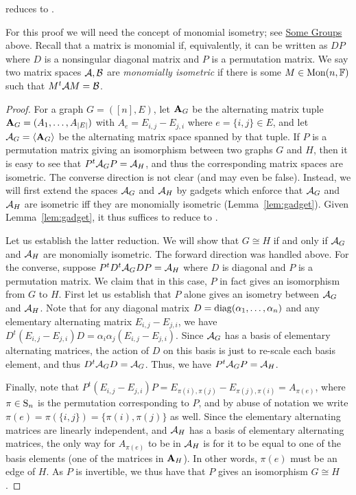 \documentclass[11pt]{article}
\begin{document}
\begin{proposition}\label{prop:GI}
\GIlong reduces to \AltMatSpIsomlong.
\end{proposition}

For this proof we will need the concept of monomial isometry; 
see \hyperref{}{}{sec:prel:groups}{Some Groups} above. Recall that a matrix 
is monomial if, equivalently, it can be written as $DP$ where $D$ is a nonsingular 
diagonal matrix and $P$ is a permutation matrix. 
We say two matrix spaces $\cA, \cB$ are \emph{monomially isometric} if there is some $M \in \Mon(n,\F)$ such that $M^t \cA M = \cB$.

\begin{proof}
For a graph $G=([n], E)$, let $\vA_G$ be the alternating matrix tuple $\vA_G = (A_1, \dotsc, A_{|E|})$ with $A_e = E_{i,j} - E_{j,i}$ where $e=\{i,j\} \in E$, and let $\cA_G = \langle \vA_G \rangle$ be the alternating matrix space spanned by that tuple. If $P$ is a permutation matrix giving an isomorphism between two graphs $G$ and $H$, then it is easy to see that $P^t \cA_G P = \cA_H$, and thus the corresponding matrix spaces are isometric. The converse direction is not clear (and may even be false). Instead, we will first extend the spaces $\cA_G$ and $\cA_H$ by gadgets which enforce that $\cA_G$ and $\cA_H$ are isometric iff they are monomially isometric (Lemma~\ref{lem:gadget}). Given Lemma~\ref{lem:gadget}, it thus suffices to reduce \GI to \AltMatSpMonIsomlong.

Let us establish the latter reduction. We will show that $G \cong H$  if and only 
if $\cA_G$ and $\cA_H$ are monomially isometric. The forward direction was handled 
above. For the converse, suppose $P^t D^t \cA_G DP = \cA_H$ 
where $D$ is diagonal and $P$ is a permutation matrix.  
We claim that in this case, $P$ in fact gives an isomorphism from $G$ to $H$. First let us establish that $P$ alone gives an isometry between $\cA_G$ and $\cA_H$. Note that for any diagonal matrix $D=\diag(\alpha_1, \dotsc, \alpha_n)$ and any elementary alternating matrix $E_{i,j} - E_{j,i}$, we have $D^t (E_{i,j} - E_{j,i}) D = \alpha_i \alpha_j (E_{i,j} - E_{j,i})$. Since $\cA_G$ has a basis of elementary alternating matrices, the action of $D$ on this basis is just to re-scale each basis element, and thus $D^t \cA_G D = \cA_G$. Thus, we have $P^t \cA_G P = \cA_H$. 

Finally, note that $P^t (E_{i,j} - E_{j,i}) P = E_{\pi(i), \pi(j)} - E_{\pi(j), 
\pi(i)} = A_{\pi(e)}$, where $\pi \in \S_n$ is the permutation corresponding to 
$P$, and by abuse of notation we write $\pi(e) = \pi(\{i,j\}) = \{\pi(i), 
\pi(j)\}$ as well. Since the elementary alternating matrices are linearly 
independent, and $\cA_H$ has a basis of elementary alternating matrices, the only 
way for $A_{\pi(e)}$ to be in $\cA_H$ is for it to be equal to one of the basis 
elements (one of the matrices in $\vA_H$). In other words, $\pi(e)$ must be an 
edge of $H$. As $P$ is invertible, we thus have that $P$ gives an isomorphism $G 
\cong H$. 
\end{proof}
\end{document}
